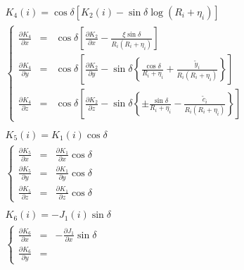 \documentclass{jarticle}
\newcommand{\yy}[1]{\tilde{y}_#1}
\newcommand{\cc}[1]{\tilde{c}_#1}
\newcommand{\re}[1]{R_#1+\eta_#1}
\begin{document}
    \begin{eqnarray*}
    &&K_4(i)=\cos\delta\left[ K_2(i)-\sin\delta \log(\re{i})\right]\\
    &&\left\{
        \begin{array}{lcl}
            \displaystyle \frac{\partial K_4}{\partial x}
            &=&
            \displaystyle \cos\delta\left[
                \frac{\partial K_2}{\partial x}-\frac{\xi\sin\delta}{R_i(\re{i})}
            \right]\\
%
            \displaystyle \frac{\partial K_4}{\partial y}
            &=&
            \displaystyle \cos\delta\left[
                \frac{\partial K_2}{\partial y}
                -\sin\delta\left\{
                    \frac{\cos\delta}{\re{i}}+\frac{\yy{i}}{R_i(\re{i})}
                \right\}
            \right]\\
%
            \displaystyle \frac{\partial K_4}{\partial z}
            &=&
            \displaystyle \cos\delta\left[
                \frac{\partial K_2}{\partial z}
                -\sin\delta\left\{
                    \pm\frac{\sin\delta}{\re{i}}-\frac{\cc{i}}{R_i(\re{i})}
                \right\}
            \right]
        \end{array}
    \right.\\
    \\
    &&K_5(i)=K_1(i)\cos\delta\\
    &&\left\{
        \begin{array}{lcl}
            \displaystyle \frac{\partial K_5}{\partial x}
            &=&
            \displaystyle \frac{\partial K_1}{\partial x}\cos\delta\\
%
            \displaystyle \frac{\partial K_5}{\partial y}
            &=&
            \displaystyle \frac{\partial K_1}{\partial y}\cos\delta\\
%
            \displaystyle \frac{\partial K_5}{\partial z}
            &=&
            \displaystyle \frac{\partial K_1}{\partial z}\cos\delta
        \end{array}
    \right.\\
    \\
    &&K_6(i)=-J_1(i)\sin\delta\\
    &&\left\{
        \begin{array}{lcl}
            \displaystyle \frac{\partial K_6}{\partial x}
            &=&
            \displaystyle -\frac{\partial J_1}{\partial x}\sin\delta\\
%
            \displaystyle \frac{\partial K_6}{\partial y}
            &=&

\end{array}
\end{eqnarray*}
\end{document}
